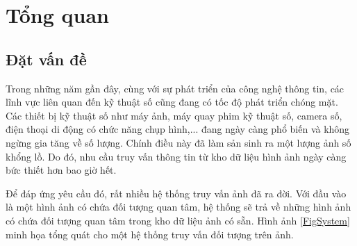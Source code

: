 
\chapter{Tổng quan}
\ifpdf
    \graphicspath{{Chapter1/Chapter1Figs/PNG/}{Chapter1/Chapter1Figs/PDF/}{Chapter1/Chapter1Figs/}}
\else
    \graphicspath{{Chapter1/Chapter1Figs/EPS/}{Chapter1/Chapter1Figs/}}
\fi
{}
\section{Đặt vấn đề}
\label{section:intro-problem}
Trong những năm gần đây, cùng với sự phát triển của công nghệ thông tin, các lĩnh vực liên quan đến kỹ thuật số cũng đang có tốc độ phát triển chóng mặt. Các thiết bị kỹ thuật số như máy ảnh, máy quay phim kỹ thuật số, camera số, điện thoại di động có chức năng chụp hình,... đang ngày càng phổ biến và không ngừng gia tăng về số lượng. Chính điều này đã làm sản sinh ra một lượng ảnh số khổng lồ. Do đó, nhu cầu truy vấn thông tin từ kho dữ liệu hình ảnh ngày càng bức thiết hơn bao giờ hết.

Để đáp ứng yêu cầu đó, rất nhiều hệ thống truy vấn ảnh đã ra đời. Với đầu vào là một hình ảnh có chứa đối tượng quan tâm, hệ thống sẽ trả về những hình ảnh có chứa đối tượng quan tâm trong kho dữ liệu ảnh có sẵn. Hình ảnh \ref{FigSystem} minh họa tổng quát cho một hệ thống truy vấn đối tượng trên ảnh.

